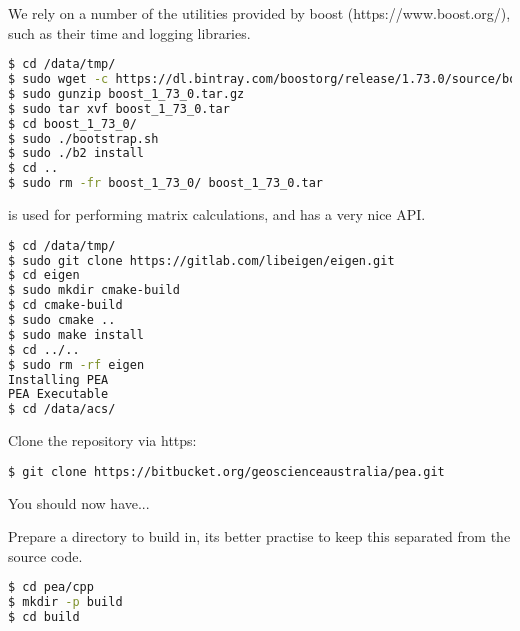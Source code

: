We rely on a number of the utilities provided by boost (https://www.boost.org/), such as their time and logging libraries.
\begin{lstlisting}[language=bash]
$ cd /data/tmp/
$ sudo wget -c https://dl.bintray.com/boostorg/release/1.73.0/source/boost_1_73_0.tar.gz
$ sudo gunzip boost_1_73_0.tar.gz
$ sudo tar xvf boost_1_73_0.tar
$ cd boost_1_73_0/
$ sudo ./bootstrap.sh
$ sudo ./b2 install
$ cd ..
$ sudo rm -fr boost_1_73_0/ boost_1_73_0.tar

\end{lstlisting}

 is used for performing matrix calculations, and has a very nice API.
\begin{lstlisting}[language=bash]
$ cd /data/tmp/
$ sudo git clone https://gitlab.com/libeigen/eigen.git
$ cd eigen
$ sudo mkdir cmake-build
$ cd cmake-build
$ sudo cmake ..
$ sudo make install
$ cd ../..
$ sudo rm -rf eigen
Installing PEA
PEA Executable
$ cd /data/acs/
\end{lstlisting}
Clone the repository via https:

\begin{lstlisting}[language=bash]
$ git clone https://bitbucket.org/geoscienceaustralia/pea.git
\end{lstlisting}
You should now have...

Prepare a directory to build in, its better practise to keep this separated from the source code.
\begin{lstlisting}[language=bash]
$ cd pea/cpp
$ mkdir -p build
$ cd build
\end{lstlisting}

